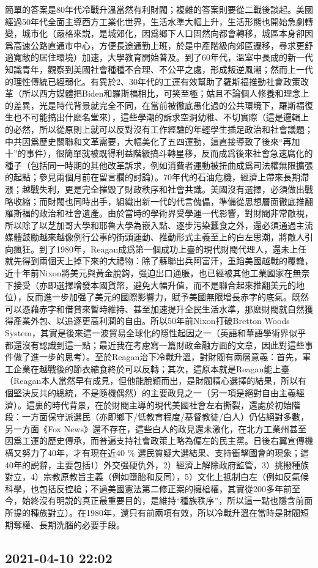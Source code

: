 \documentclass[twocolumn]{ctexart}
\begin{document}
簡單的答案是80年代冷戰升溫當然有利財閥；複雜的答案則要從二戰後談起。美國經過50年代全面主導西方工業化世界，生活水準大幅上升，生活形態也開始急劇轉變，城市化（嚴格來説，是城郊化，因爲鄉下人口固然向都會轉移，城區本身卻因爲高速公路直通市中心，方便長途通勤上班，於是中產階級向郊區遷移，尋求更舒適寬敞的居住環境）加速，大學教育開始普及。到了60年代，溫室中長成的新一代知識青年，觀察到美國社會種種不合理、不公平之處，形成叛逆風潮；然而上一代的理性傳統已經弱化。有異於2、30年代的工運有效幫助了羅斯福推動社會政策改革（所以西方媒體把Biden和羅斯福相比，可笑至極；姑且不論個人修養和理念上的差異，光是時代背景就完全不同，在當前被徹底愚化過的公共環境下，羅斯福復生也不可能搞出什麽名堂來），這些學潮的訴求空洞幼稚、不切實際（這是邏輯上的必然，所以從原則上就可以反對沒有工作經驗的年輕學生插足政治和社會議題；中共因爲歷史關聯和文革需要，大幅美化了五四運動，這直接導致了後來“再加十”的事件），很簡單就被既得利益階級搞斗轉星移，反而成爲後來社會急速腐化的種子（包括同一時期的其他改革訴求，例如消費者運動被扭曲成爲司法權無限擴張的起點；參見兩個月前在留言欄的討論）。70年代的石油危機，經濟上帶來長期滯漲；越戰失利，更是完全摧毀了財政秩序和社會共識。美國沒有選擇，必須做出戰略收縮；而財閥也同時出手，組織出新一代的代言傀儡，準備從思想層面徹底推翻羅斯福的政治和社會遺產。由於當時的學術界受學運一代影響，對財閥非常敵視，所以除了以芝加哥大學和耶魯大學為嵌入點、逐步污染蠶食之外，還必須通過主流媒體鼓勵越來越像例行公事的街頭運動、推動形式主義至上的白左思潮，將敵人引向瘋狂。到了1980年，Reagan成爲第一個成功上臺的現代財閥代理人，還未上任就先得到兩個天上掉下來的大禮物：除了蘇聯出兵阿富汗，重蹈美國越戰的覆轍，近十年前Nixon將美元與黃金脫鈎，强迫出口通脹，也已經被其他工業國家在無奈下接受（亦即選擇增發本國貨幣，避免大幅升值，而不是聯合起來推翻美元的地位），反而進一步加强了美元的國際影響力，賦予美國無限增長赤字的底氣。既然可以憑藉赤字和借貸來暫時維持、甚至加速提升全民生活水準，那麽財閥就自然獲得產業外包、以追逐更高利潤的自由。所以50年前Nixon打破Bretton Woods System，其實是後來這一波貿易全球化的隱性起因之一（英語和華語學術界似乎都還沒有認識到這一點；最近我在考慮寫一篇財政金融方面的文章，因此對這些事件做了進一步的思考）。至於Reagan治下冷戰升溫，對財閥有兩層意義：首先，軍工企業在越戰後的節衣縮食終於可以反轉；其次，這原本就是Reagan能上臺（Reagan本人當然早有成見，但他能脫穎而出，是財閥精心選擇的結果，所以有個堅決反共的總統，不是隨機偶然）的主要政見之一（另一項是絕對自由主義經濟）。這裏的時代背景，在於財閥主導的現代美國社會左右撕裂，還處於初始階段：一方面保守派選民（亦即鄉下/低教育程度/基督教徒/白人）仍佔絕對多數，另一方面《Fox News》還不存在，這些白人的政見還未激化，在北方工業州甚至因爲工運的歷史傳承，而普遍支持社會政策上略為偏左的民主黨。日後右翼宣傳機構又努力了40年，才有現在近40 \% 選民質疑大選結果、支持衝擊國會的現象；這40年的説辭，主要包括1）外交强硬仇外，2）經濟上解除政府監管，3）挑撥種族對立，4）宗教原教旨主義（例如墮胎和反同），5）文化上抵制白左（例如反氣候科學，也包括反控槍；不過美國憲法第二修正案的擁槍權，其實從200多年前至今，始終沒有明説的真正最重要目的，是維持“種族秩序”，所以這一點也隱含前面所提的種族對立）。在1980年，還只有前兩項有效，所以冷戰升溫在當時是財閥短期奪權、長期洗腦的必要手段。\subsection*{2021-04-10 22:02}
\end{document}
